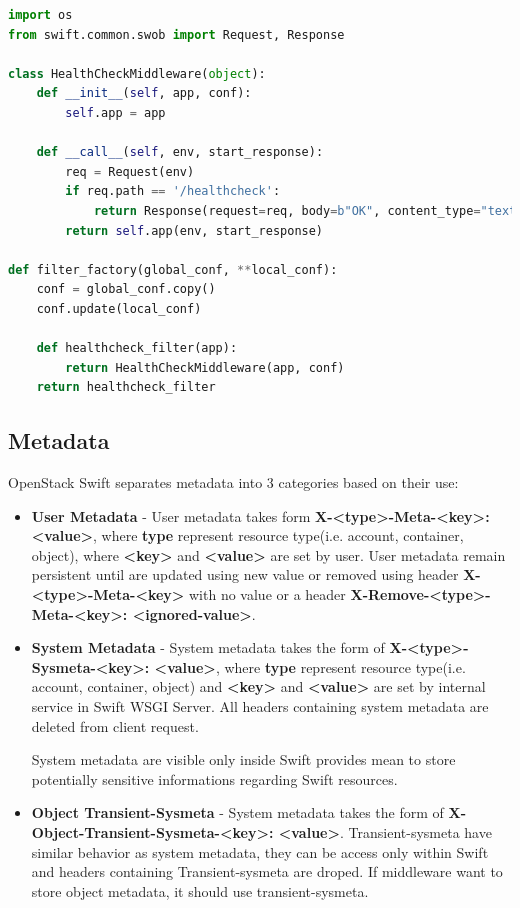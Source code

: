 \lstset{style=mystyle}

\begin{lstlisting}[language=Python]
import os
from swift.common.swob import Request, Response

class HealthCheckMiddleware(object):
    def __init__(self, app, conf):
        self.app = app

    def __call__(self, env, start_response):
        req = Request(env)
        if req.path == '/healthcheck':
            return Response(request=req, body=b"OK", content_type="text/plain")(env, start_response)
        return self.app(env, start_response)

def filter_factory(global_conf, **local_conf):
    conf = global_conf.copy()
    conf.update(local_conf)

    def healthcheck_filter(app):
        return HealthCheckMiddleware(app, conf)
    return healthcheck_filter
\end{lstlisting}

    \subsection{Metadata}
    OpenStack Swift separates metadata into 3 categories based on their use:
    \begin{itemize}
        \item \textbf{User Metadata} - User metadata takes form \textbf{X-<type>-Meta-<key>: <value>}, where \textbf{type} represent resource type(i.e. account, container, object), where \textbf{<key>} and \textbf{<value>} are set by user. User metadata remain persistent until are updated using new value or removed using header  \textbf{X-<type>-Meta-<key>} with no value or a header \textbf{X-Remove-<type>-Meta-<key>: <ignored-value>}.
        \item \textbf{System Metadata} - System metadata takes the form of \textbf{X-<type>-Sysmeta-<key>: <value>}, where \textbf{type} represent resource type(i.e. account, container, object) and \textbf{<key>} and \textbf{<value>} are set by internal service in Swift WSGI Server.
        All headers containing system metadata are deleted from client request.

        System metadata are visible only inside Swift provides mean to store potentially sensitive informations regarding Swift resources.
        \item \textbf{Object Transient-Sysmeta} - System metadata takes the form of \textbf{X-Object-Transient-Sysmeta-<key>: <value>}. Transient-sysmeta have similar behavior as system metadata, they can be access only within Swift and headers containing Transient-sysmeta are droped. If middleware want to store object metadata, it should use transient-sysmeta\cite{swiftMiddleware}.
    \end{itemize}


